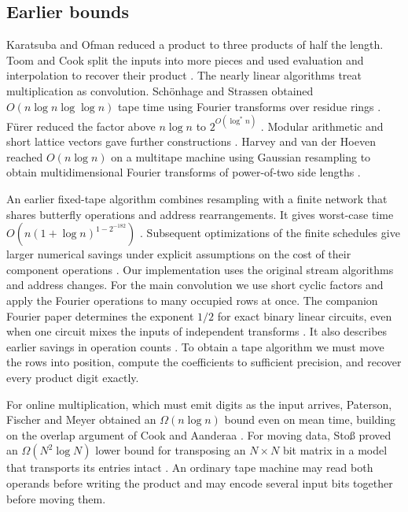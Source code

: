 \subsection{Earlier bounds}

Karatsuba and Ofman reduced a product to three products of half the
length. Toom and Cook split the inputs into more pieces and used
evaluation and interpolation to recover their product
\cite{karatsubaofman,toom,cook}. The nearly linear algorithms treat
multiplication as convolution. Sch\"onhage and Strassen obtained
$O(n\log n\log\log n)$ tape time using Fourier transforms over
residue rings \cite{schonhagestrassen}. F\"urer reduced the factor
above $n\log n$ to $2^{O(\log^*n)}$ \cite{furer}. Modular arithmetic
and short lattice vectors gave further constructions
\cite{DeKururSahaSaptharishi2013,HarveyHoevenLecerf2016,HarveyHoeven2019Lattice}.
Harvey and van der Hoeven reached $O(n\log n)$ on a multitape machine
using Gaussian resampling to obtain multidimensional Fourier transforms
of power-of-two side lengths \cite{hvh}.

An earlier fixed-tape algorithm combines resampling with a finite
network that shares butterfly operations and address rearrangements.
It gives worst-case time $O(n(1+\log n)^{1-2^{-182}})$
\cite[Theorem~1]{Tape}. Subsequent optimizations of the finite
schedules give larger numerical savings under explicit assumptions
on the cost of their component operations \cite{ChenTapeSchedules}.
Our implementation uses the original stream algorithms and address
changes. For the main convolution we use short cyclic factors
and apply the Fourier operations to many occupied rows at once.
The companion Fourier paper determines the exponent $1/2$ for exact
binary linear circuits, even when one circuit mixes the inputs of
independent transforms \cite[Theorem~]{oaF}. It
also describes earlier savings in operation counts
\cite{AlmanRao,FiniteFourier,ExplicitFourier,Sussman,Kartal}.
To obtain a tape algorithm we must move the rows into position,
compute the coefficients to sufficient precision, and recover every
product digit exactly.

For online multiplication, which must emit digits as the input arrives,
Paterson, Fischer and Meyer obtained an $\Omega(n\log n)$ bound even
on mean time, building on the overlap argument of Cook and Aanderaa
\cite{CA,PFM}. For moving data, Sto{\ss} proved an
$\Omega(N^2\log N)$ lower bound for transposing an $N\times N$ bit
matrix in a model that transports its entries intact \cite{moveonly}.
An ordinary tape machine may read both operands before writing the
product and may encode several input bits together before moving them.

